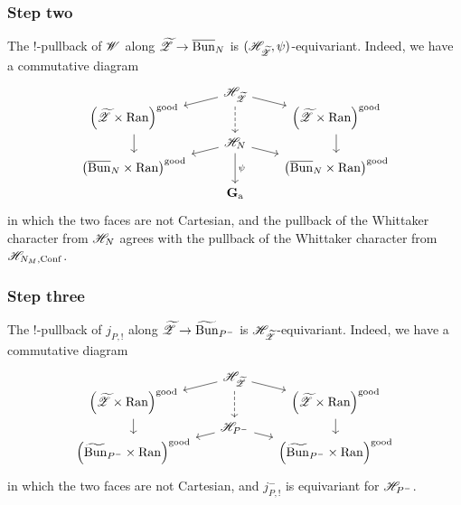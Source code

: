 \subsubsection{Step two} The $!$-pullback of $\mathscr{W}$ along ${\widetilde{\mathscr{Z}}} \to \overline{\mathrm{Bun}}_N$ is $(\mathscr{H}_{\widetilde{\mathscr{Z}}}, \psi)$-equivariant. Indeed, we have a commutative diagram
\[
\begin{tikzcd}[
  column sep={8em,between origins},
  row sep={2em,between origins}
]
    & \HH_\ZZt \arrow[dl] \arrow[dr] \arrow[dd, dashed] & \\
    \left(\ZZt \times \Ran \right)^\good \arrow[dd] & & \left(\ZZt \times \Ran \right)^\good \arrow[dd] \\
    & \HH_N \arrow[dl] \arrow[dr] \arrow[dd, "\psi"] & \\
    \left(\Bunc_N \times \Ran \right)^\good & & \left(\Bunc_N \times \Ran \right)^\good \\
    & \Ga &
\end{tikzcd}
\]
in which the two faces are not Cartesian, and the pullback of the Whittaker character from $\mathscr{H}_N$ agrees with the pullback of the Whittaker character from $\mathscr{H}_{N_M,\mathrm{Conf}}$.

\subsubsection{Step three} The $!$-pullback of $j_{P,!}$ along ${\widetilde{\mathscr{Z}}} \to \widetilde{\mathrm{Bun}}_{P^-}$ is $\mathscr{H}_{\widetilde{\mathscr{Z}}}$-equivariant. Indeed, we have a commutative diagram
\[
\begin{tikzcd}[
  column sep={8em,between origins},
  row sep={2em,between origins}
]
    & \HH_\ZZt \arrow[dl] \arrow[dr] \arrow[dd, dashed] & \\
    \left(\ZZt \times \Ran \right)^\good \arrow[dd] & & \left(\ZZt \times \Ran \right)^\good \arrow[dd] \\
    & \HH_{P^-} \arrow[dl] \arrow[dr] & \\
    \left(\Bunt_{P^-} \times \Ran \right)^\good & & \left(\Bunt_{P^-} \times \Ran \right)^\good
\end{tikzcd}
\]
in which the two faces are not Cartesian, and $j_{P,!}^-$ is equivariant for $\mathscr{H}_{P^-}$.
